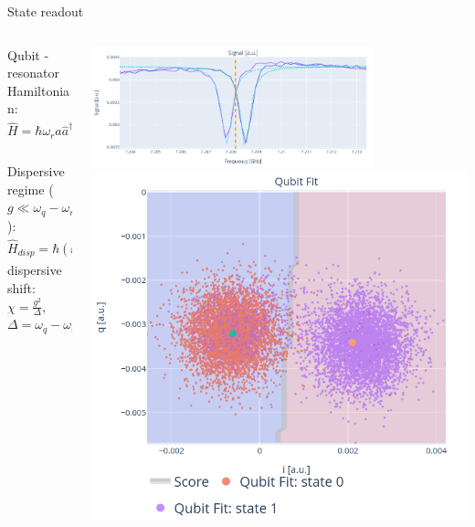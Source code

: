 \documentclass[aspectratio=169,10pt]{beamer}
\begin{document}
\begin{frame}{State readout}
  \begin{columns}
    \begin{column}{0.35\textwidth}
      Qubit - resonator Hamiltonian:
      \begin{equation*}
        \hat{H} = \hbar\omega_r\hat{a}\hat{a}^\dagger - \frac{\hbar\omega_{01}}{2}\hat{\sigma}_z + \hbar g(\hat{\sigma}^+\hat{a}+\hat{\sigma}^-\hat{a}^\dagger)
      \end{equation*}\\
      \vspace{1.5em}
      Dispersive regime ($g \ll \omega_q - \omega_r$):
      \begin{equation*}
        \hat{H}_{disp} = \hbar(\omega_r - \chi\hat{\sigma}_z)\hat{a}^\dagger\hat{a} - \frac{\hbar}{2}(\omega_{01}+\chi)\hat{\sigma}_z
      \end{equation*}
      dispersive shift: $\chi = \frac{g^2}{\Delta},$ \hfill $\Delta = \omega_q - \omega_r$
    \end{column}
    \begin{column}{0.65\textwidth}
      \centering
      \includegraphics[width=0.75\textwidth]{figures/disp_sihft.png}
      \hspace{10mm}
      \includegraphics[height=0.4\textwidth]{figures/classification.png}
    \end{column}
  \end{columns}
\end{frame}
\end{document}
